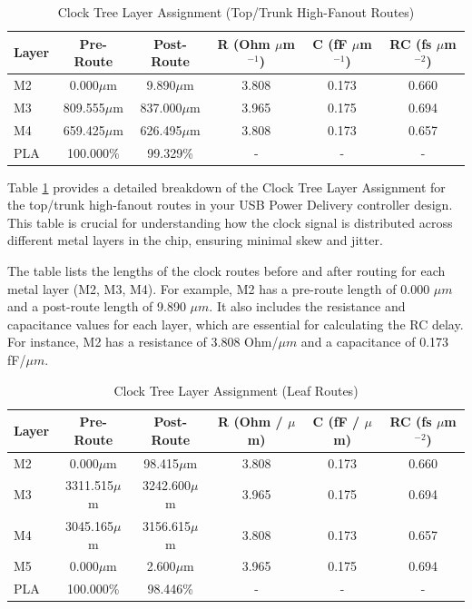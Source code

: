 \begin{table}[H]
\centering
\caption{Clock Tree Layer Assignment (Top/Trunk High-Fanout Routes)}
\begin{tabular}{|l|c|c|c|c|c|}
\hline
\textbf{Layer} & \textbf{Pre-Route} & \textbf{Post-Route} & \textbf{R (Ohm $\mu$m$^{-1}$)} & \textbf{C (fF $\mu$m$^{-1}$)} & \textbf{RC (fs $\mu$m$^{-2}$)} \\
\hline
M2 & 0.000$\mu$m & 9.890$\mu$m & 3.808 & 0.173 & 0.660 \\
M3 & 809.555$\mu$m & 837.000$\mu$m & 3.965 & 0.175 & 0.694 \\
M4 & 659.425$\mu$m & 626.495$\mu$m & 3.808 & 0.173 & 0.657 \\
PLA & 100.000\% & 99.329\% & - & - & - \\
\hline
\end{tabular}
\label{table:clock_tree_layer_assignment}
\end{table}
Table \ref{table:clock_tree_layer_assignment} provides a detailed breakdown of the Clock Tree Layer Assignment for the top/trunk high-fanout routes in your USB Power Delivery controller design. This table is crucial for understanding how the clock signal is distributed across different metal layers in the chip, ensuring minimal skew and jitter.

The table lists the lengths of the clock routes before and after routing for each metal layer (M2, M3, M4). For example, M2 has a pre-route length of 0.000 \(\mu m\) and a post-route length of 9.890 \(\mu m\). It also includes the resistance and capacitance values for each layer, which are essential for calculating the RC delay. For instance, M2 has a resistance of 3.808 Ohm/\(\mu m\) and a capacitance of 0.173 fF/\(\mu m\).


\begin{table}[H]
\centering
\caption{Clock Tree Layer Assignment (Leaf Routes)}
\begin{tabular}{|l|c|c|c|c|c|}
\hline
\textbf{Layer} & \textbf{Pre-Route} & \textbf{Post-Route} & \textbf{R (Ohm / $\mu$m)} & \textbf{C (fF / $\mu$m)} & \textbf{RC (fs $\mu$m$^{-2}$)} \\
\hline
M2 & 0.000$\mu$m & 98.415$\mu$m & 3.808 & 0.173 & 0.660 \\
M3 & 3311.515$\mu$m & 3242.600$\mu$m & 3.965 & 0.175 & 0.694 \\
M4 & 3045.165$\mu$m & 3156.615$\mu$m & 3.808 & 0.173 & 0.657 \\
M5 & 0.000$\mu$m & 2.600$\mu$m & 3.965 & 0.175 & 0.694 \\
PLA & 100.000\% & 98.446\% & - & - & - \\
\hline
\end{tabular}
\label{table:clock_tree_layer_assignment_leaf}
\end{table}

